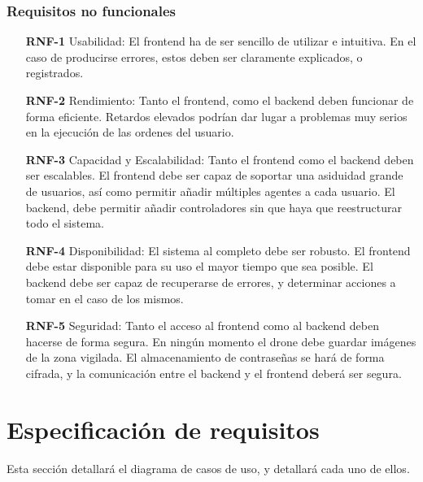 \subsubsection{Requisitos no funcionales}
\begin{itemize}
\item[\textbf{RNF-1}] Usabilidad: El frontend ha de ser sencillo de utilizar e intuitiva. En el caso de producirse errores, estos deben ser claramente explicados, o registrados.
\item[\textbf{RNF-2}] Rendimiento: Tanto el frontend, como el backend deben funcionar de forma eficiente. Retardos elevados podrían dar lugar a problemas muy serios en la ejecución de las ordenes del usuario.
\item[\textbf{RNF-3}] Capacidad y Escalabilidad: Tanto el frontend como el backend deben ser escalables. El frontend debe ser capaz de soportar una asiduidad grande de usuarios, así como permitir añadir múltiples agentes a cada usuario. El backend, debe permitir añadir controladores sin que haya que reestructurar todo el sistema.
\item[\textbf{RNF-4}] Disponibilidad: El sistema al completo debe ser robusto. El frontend debe estar disponible para su uso el mayor tiempo que sea posible. El backend debe ser capaz de recuperarse de errores, y determinar acciones a tomar en el caso de los mismos.
\item[\textbf{RNF-5}] Seguridad: Tanto el acceso al frontend como al backend deben hacerse de forma segura. En ningún momento el drone debe guardar imágenes de la zona vigilada. El almacenamiento de contraseñas se hará de forma cifrada, y la comunicación entre el backend y el frontend deberá ser segura.
\end{itemize}

\section{Especificación de requisitos}

Esta sección detallará el diagrama de casos de uso, y detallará cada uno de ellos. 





